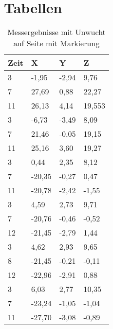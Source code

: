 \section{Tabellen}
\begin{table}[H]
\centering
\begin{tabular}{llll}
\textbf{Zeit} & \textbf{X} & \textbf{Y } & \textbf{Z} \\
\hline
\hline
3    & -1,95  & -2,94 & 9,76   \\
7    & 27,69  & 0,88  & 22,27  \\
11   & 26,13  & 4,14  & 19,553 \\
\hline
3    & -6,73  & -3,49 & 8,09   \\
7    & 21,46  & -0,05 & 19,15  \\
11   & 25,16  & 3,60  & 19,27  \\
\hline
3    & 0,44   & 2,35  & 8,12   \\
7    & -20,35 & -0,27 & 0,47   \\
11   & -20,78 & -2,42 & -1,55  \\
\hline
3    & 4,59   & 2,73  & 9,71   \\
7    & -20,76 & -0,46 & -0,52  \\
12   & -21,45 & -2,79 & 1,44   \\
\hline
3    & 4,62   & 2,93  & 9,65   \\
8    & -21,45 & -0,21 & -0,11  \\
12   & -22,96 & -2,91 & 0,88   \\
\hline
3    & 6,03   & 2,77  & 10,35  \\
7    & -23,24 & -1,05 & -1,04  \\
11   & -27,70 & -3,08 & -0,89 
\end{tabular}
\caption{Messergebnisse mit Unwucht auf Seite mit Markierung}
\label{tab:imbalance_same_side-full}
\end{table}


